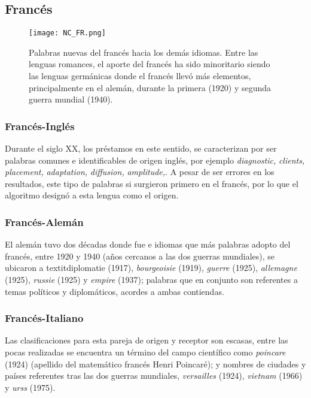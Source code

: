 \subsection{Francés} %

\begin{figure}[h!]
	\centering
	\texttt{[image: NC\_FR.png]}
	\label{fig.NC_FR}
	\caption{Palabras nuevas del francés hacia los demás idiomas. Entre las lenguas romances, el aporte del francés ha sido minoritario siendo las lenguas germánicas donde el francés llevó más elementos, principalmente en el alemán, durante la primera (1920) y segunda guerra mundial (1940).}
	
	
\end{figure}

\subsubsection*{Francés-Inglés}%

Durante el siglo XX, los préstamos en este sentido, se caracterizan por ser palabras comunes e identificables de origen inglés,  por ejemplo  \textit{diagnostic,} \textit{clients,} \textit{placement,} \textit{adaptation,} \textit{diffusion,} \textit{amplitude,}.  A pesar de ser errores en los resultados, este tipo de palabras si surgieron primero en el francés, por lo que el algoritmo designó a esta lengua como el origen. 

\subsubsection*{Francés-Alemán}%

El alemán tuvo dos décadas donde  fue e idiomas que más palabras adopto del francés, entre 1920 y 1940  (años cercanos a las dos guerras mundiales), se ubicaron a  textit{diplomatie} (1917), \textit{bourgeoisie} (1919),  \textit{guerre} (1925), \textit{allemagne} (1925), \textit{russie} (1925) y \textit{empire} (1937); palabras que en conjunto son referentes a temas políticos y diplomáticos, acordes a ambas contiendas. 


\subsubsection*{Francés-Italiano}%

Las clasificaciones para esta pareja de origen y receptor son escasas, entre las pocas realizadas se encuentra un término del campo científico como \textit{poincare} (1924) (apellido del matemático francés Henri Poincaré);  y nombres de ciudades y países referentes tras las dos guerras mundiales, \textit{versailles} (1924), \textit{vietnam} (1966)  y \textit{urss} (1975).


